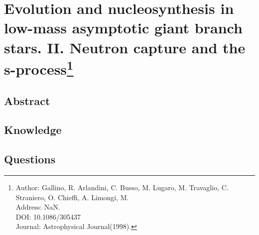 \section[Evolution and nucleosynthesis in low-mass asymptotic giant branch stars. II. Neutron capture and the s-process]{Evolution and nucleosynthesis in low-mass asymptotic giant branch stars. II. Neutron capture and the s-process\protect\footnote{Author: Gallino, R. Arlandini, C. Busso, M. Lugaro, M. Travaglio, C. Straniero, O. Chieffi, A. Limongi, M. \\Address: NaN. \\DOI: 10.1086/305437 \\Journal: Astrophysical Journal(1998).}}
\subsection{Abstract}

\subsection{Knowledge}

\subsection{Questions}